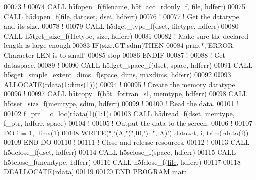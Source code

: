 \begin{DoxyCode}
00073   \textcolor{comment}{!}
00074   \textcolor{keyword}{CALL }h5fopen\_f(filename, h5f\_acc\_rdonly\_f, \hyperlink{structfile}{file}, hdferr)
00075   \textcolor{keyword}{CALL }h5dopen\_f(\hyperlink{structfile}{file}, dataset, dset, hdferr)
00076   \textcolor{comment}{!}
00077   \textcolor{comment}{! Get the datatype and its size.}
00078   \textcolor{comment}{!}
00079   \textcolor{keyword}{CALL }h5dget\_type\_f(dset, filetype, hdferr)
00080   \textcolor{keyword}{CALL }h5tget\_size\_f(filetype, \textcolor{keyword}{size}, hdferr)
00081 
00082   \textcolor{comment}{! Make sure the declared length is large enough}
00083   \textcolor{keywordflow}{IF}(size.GT.sdim)\textcolor{keywordflow}{THEN}
00084      print*,\textcolor{stringliteral}{'ERROR: Character LEN is to small'}
00085      stop
00086 \textcolor{keywordflow}{  ENDIF}
00087   \textcolor{comment}{!}
00088   \textcolor{comment}{! Get dataspace.}
00089   \textcolor{comment}{!}
00090   \textcolor{keyword}{CALL }h5dget\_space\_f(dset, space, hdferr)
00091   \textcolor{keyword}{CALL }h5sget\_simple\_extent\_dims\_f(space, dims, maxdims, hdferr)
00092 
00093   \textcolor{keyword}{ALLOCATE}(rdata(1:dims(1)))
00094   \textcolor{comment}{!}
00095   \textcolor{comment}{! Create the memory datatype.}
00096   \textcolor{comment}{!}
00097   \textcolor{keyword}{CALL }h5tcopy\_f(h5t\_fortran\_s1, memtype, hdferr)
00098   \textcolor{keyword}{CALL }h5tset\_size\_f(memtype, sdim, hdferr)
00099   \textcolor{comment}{!}
00100   \textcolor{comment}{! Read the data.}
00101   \textcolor{comment}{!}
00102   f\_ptr = c\_loc(rdata(1)(1:1))
00103   \textcolor{keyword}{CALL }h5dread\_f(dset, memtype, f\_ptr, hdferr, space)
00104   \textcolor{comment}{!}
00105   \textcolor{comment}{! Output the data to the screen.}
00106   \textcolor{comment}{!}
00107   \textcolor{keywordflow}{DO} i = 1, dims(1)
00108      \textcolor{keyword}{WRITE}(*,\textcolor{stringliteral}{'(A,"(",I0,"): ", A)'}) dataset, i, trim(rdata(i))
00109 \textcolor{keywordflow}{  END DO}
00110   \textcolor{comment}{!}
00111   \textcolor{comment}{! Close and release resources.}
00112   \textcolor{comment}{!}
00113   \textcolor{keyword}{CALL }h5dclose\_f(dset, hdferr)
00114   \textcolor{keyword}{CALL }h5sclose\_f(space, hdferr)
00115   \textcolor{keyword}{CALL }h5tclose\_f(memtype, hdferr)
00116   \textcolor{keyword}{CALL }h5fclose\_f(\hyperlink{structfile}{file}, hdferr)
00117 
00118   \textcolor{keyword}{DEALLOCATE}(rdata)
00119 
00120 \textcolor{keyword}{END PROGRAM }main
\end{DoxyCode}
